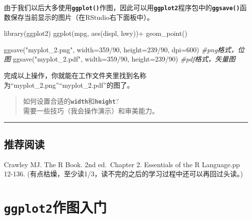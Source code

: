 \documentclass[
]{book}
\newenvironment{Shaded}{\begin{snugshade}}{\end{snugshade}}
\newcommand{\AttributeTok}[1]{\textcolor[rgb]{0.77,0.63,0.00}{#1}}
\newcommand{\CommentTok}[1]{\textcolor[rgb]{0.56,0.35,0.01}{\textit{#1}}}
\newcommand{\DecValTok}[1]{\textcolor[rgb]{0.00,0.00,0.81}{#1}}
\newcommand{\FunctionTok}[1]{\textcolor[rgb]{0.00,0.00,0.00}{#1}}
\newcommand{\NormalTok}[1]{#1}
\newcommand{\SpecialCharTok}[1]{\textcolor[rgb]{0.00,0.00,0.00}{#1}}
\newcommand{\StringTok}[1]{\textcolor[rgb]{0.31,0.60,0.02}{#1}}
\begin{document}
由于我们以后大多使用\textbf{\texttt{ggplot()}}作图，因此可以用\textbf{\texttt{ggplot2}}程序包中的\textbf{\texttt{ggsave()}}函数保存当前显示的图片（在RStudio右下面板中）。

\begin{Shaded}
\begin{Highlighting}[]
\FunctionTok{library}\NormalTok{(ggplot2)}
\FunctionTok{ggplot}\NormalTok{(mpg, }\FunctionTok{aes}\NormalTok{(displ, hwy))}\SpecialCharTok{+}
  \FunctionTok{geom\_point}\NormalTok{()}

\FunctionTok{ggsave}\NormalTok{(}\StringTok{"myplot\_2.png"}\NormalTok{, }\AttributeTok{width=}\DecValTok{359}\SpecialCharTok{/}\DecValTok{90}\NormalTok{, }\AttributeTok{height=}\DecValTok{239}\SpecialCharTok{/}\DecValTok{90}\NormalTok{, }\AttributeTok{dpi=}\DecValTok{600}\NormalTok{) }\CommentTok{\#png格式，位图}
\FunctionTok{ggsave}\NormalTok{(}\StringTok{"myplot\_2.pdf"}\NormalTok{, }\AttributeTok{width=}\DecValTok{359}\SpecialCharTok{/}\DecValTok{90}\NormalTok{, }\AttributeTok{height=}\DecValTok{239}\SpecialCharTok{/}\DecValTok{90}\NormalTok{) }\CommentTok{\#pdf格式，矢量图}
\end{Highlighting}
\end{Shaded}

完成以上操作，你就能在工作文件夹里找到名称为``myplot\_2.png''``myplot\_2.pdf''的图了。

\begin{quote}
如何设置合适的\textbf{\texttt{width}}和\textbf{\texttt{height}}?\\
需要一些技巧（我会操作演示）和审美能力。
\end{quote}

\begin{center}\rule{0.5\linewidth}{0.5pt}\end{center}

\hypertarget{ux63a8ux8350ux9605ux8bfb}{%
\section{推荐阅读}\label{ux63a8ux8350ux9605ux8bfb}}

Crawley MJ. The R Book. 2nd ed.~Chapter 2. Essentials of the R Language.pp 12-136.
(有点枯燥，至少读1/3，读不完的之后的学习过程中还可以再回过头读。)

\hypertarget{ggplot2ux4f5cux56feux5165ux95e8}{%
\chapter{\texorpdfstring{\texttt{ggplot2}作图入门}{ggplot2作图入门}}\label{ggplot2ux4f5cux56feux5165ux95e8}}
\end{document}
